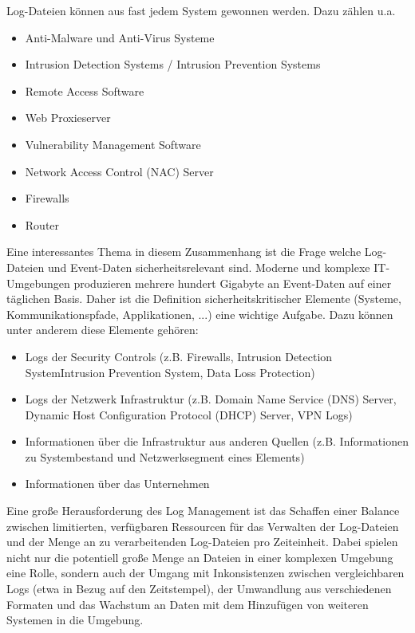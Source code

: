 Log-Dateien können aus fast jedem System gewonnen werden. Dazu zählen u.a. 
\begin{itemize}
\item Anti-Malware und Anti-Virus Systeme
\item Intrusion Detection Systems / Intrusion Prevention Systems
\item Remote Access Software
\item Web Proxieserver
\item Vulnerability Management Software 
\item Network Access Control (NAC) Server
\item Firewalls
\item Router
\end{itemize}

Eine interessantes Thema in diesem Zusammenhang ist die Frage welche Log-Dateien und Event-Daten sicherheitsrelevant sind. Moderne und komplexe IT-Umgebungen produzieren mehrere hundert Gigabyte an Event-Daten auf einer täglichen Basis. Daher ist die Definition sicherheitskritischer Elemente (Systeme, Kommunikationspfade, Applikationen, ...) eine wichtige Aufgabe.
Dazu können unter anderem diese Elemente gehören:
\begin{itemize}
\item Logs der Security Controls (z.B. Firewalls, Intrusion Detection System\/Intrusion Prevention System, Data Loss Protection)
\item Logs der Netzwerk Infrastruktur (z.B. Domain Name Service (DNS) Server, Dynamic Host Configuration Protocol (DHCP) Server, VPN Logs)
\item Informationen über die Infrastruktur aus anderen Quellen (z.B. Informationen zu Systembestand und Netzwerksegment eines Elements)
\item Informationen über das Unternehmen
\end{itemize}


Eine große Herausforderung des Log Management ist das Schaffen einer Balance zwischen limitierten, verfügbaren Ressourcen für das Verwalten der Log-Dateien und der Menge an zu verarbeitenden Log-Dateien pro Zeiteinheit. Dabei spielen nicht nur die potentiell große Menge an Dateien in einer komplexen Umgebung eine Rolle, sondern auch der Umgang mit Inkonsistenzen zwischen vergleichbaren Logs (etwa in Bezug auf den Zeitstempel), der Umwandlung aus verschiedenen Formaten und das Wachstum an Daten mit dem Hinzufügen von weiteren Systemen in die Umgebung.

